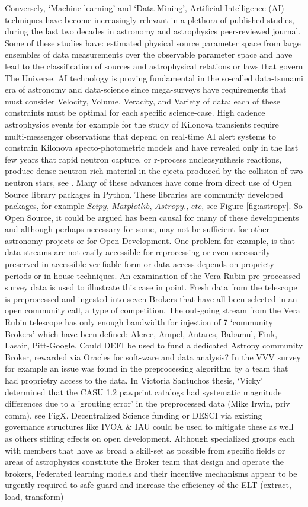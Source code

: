 \documentclass[final,5p,times,twocolumn,authoryear]{elsarticle}
\begin{document}
Conversely,  `Machine-learning' and `Data Mining', Artificial Intelligence (AI) techniques have become increasingly relevant in a plethora of published studies, during the last two decades in astronomy and astrophysics peer-reviewed journal. Some of these studies have: estimated physical source parameter space from large ensembles of data measurements over the observable parameter space and have lead to the classification of sources and astrophysical relations or laws that govern The Universe. AI technology is proving fundamental in the so-called data-tsunami era of astronomy and data-science since mega-surveys have requirements that must consider Velocity, Volume, Veracity, and Variety of data; each of these constraints must be optimal for each specific science-case. High cadence astrophysics events for example for the study of Kilonova transients require multi-messenger observations that depend on real-time AI alert systems to constrain Kilonova specto-photometric models and have revealed only in the last few years that rapid neutron capture, or r-process nucleosynthesis reactions, produce dense neutron-rich material in the ejecta produced by the collision of two neutron stars, see \cite{artola2020}. Many of these advances have come from direct use of Open Source library packages in Python. These libraries are community developed packages, for example $\textit{Scipy, Matplotlib, Astropy., etc}$, see Figure \ref{fig:astropy}. So Open Source, it could be argued has been causal for many of these developments and although perhaps necessary for some, may not be sufficient for other astronomy projects or for Open Development. One problem for example, is that data-streams are not easily accessible for reprocessing or even necessarily preserved in accessible verifiable form or data-access depends on propriety periods or in-house techniques. An examination of the Vera Rubin pre-processsed survey data is used to illustrate this case in point. Fresh data from the telescope is preprocessed and ingested into seven Brokers that have all been selected in an open community call, a type of competition.  The out-going stream from the Vera Rubin telescope has only enough bandwidth for injestion of 7 `community Brokers' which have been defined: Alerce, Ampel, Antares, Babamul, Fink, Lasair, Pitt-Google. Could DEFI be used to fund a dedicated Astropy community Broker, rewarded via Oracles for soft-ware and data analysis? In the VVV survey for example an issue was found in the preprocessing algorithm by a team that had proprietry access to the data. In Victoria Santuchos thesis, `Vicky' determined that the CASU 1.2 pawprint catalogs had systematic magnitude differences due to a 'grouting error' in the preprocessed data (Mike Irwin, priv comm), see FigX. Decentralized Science funding or DESCI via existing governance structures like IVOA \& IAU could be used to mitigate these as well as others stifling effects on open development. Although specialized groups each with members that have as broad a skill-set as possible from specific fields or areas of astrophysics constitute the Broker team that  design and operate the brokers, Federated learning models and their incentive mechanisms appear to be urgently required to safe-guard and increase the efficiency of the  ELT (extract, load, transform) 
\end{document}
